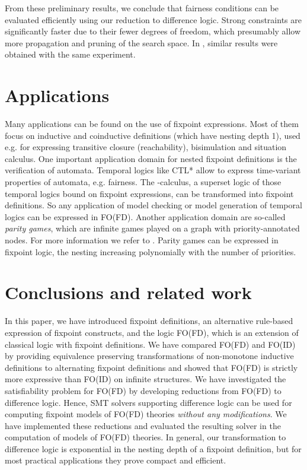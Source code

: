 \documentclass{tlp}
\begin{document}
From these preliminary results, we conclude that fairness conditions can be evaluated efficiently using our reduction to difference logic. Strong constraints are significantly faster due to their fewer degrees of freedom, which presumably allow more propagation and pruning of the search space. In \cite{wlp/KeinanenN04}, similar results were obtained with the same experiment.

\section{Applications}\label{sec:app}
Many applications can be found on the use of fixpoint expressions. Most of them focus on inductive and coinductive definitions (which have nesting depth 1), used e.g. for expressing transitive closure (reachability), bisimulation and situation calculus. One important application domain for nested fixpoint definitions is the verification of automata. Temporal logics like CTL* allow to express time-variant properties of automata, e.g. fairness. The -calculus, a superset logic of those temporal logics bound on fixpoint expressions, can be transformed into fixpoint definitions. So any application of model checking or model generation of temporal logics can be expressed in FO(FD). Another application domain are so-called \emph{parity games}, which are infinite games played on a graph with priority-annotated nodes. For more information we refer to \cite{atva/FriedmannL09}. Parity games can be expressed in fixpoint logic, the nesting increasing polynomially with the number of priorities.

\section{Conclusions and related work}\label{sec:con}
In this paper, we have introduced fixpoint definitions, an alternative rule-based expression of fixpoint constructs, and the logic FO(FD), which is an extension of classical logic with fixpoint definitions. We have compared FO(FD) and FO(ID) by providing equivalence preserving transformations of non-monotone inductive definitions to alternating fixpoint definitions and showed that FO(FD) is strictly more expressive than FO(ID) on infinite structures. We have investigated the satisfiability problem for FO(FD) by developing reductions from FO(FD) to difference logic. Hence, SMT solvers supporting difference logic can be used for computing fixpoint models of FO(FD) theories {\em without any modifications}. We have implemented these reductions and evaluated the resulting solver in the computation of models of FO(FD) theories. In general, our transformation to difference logic is exponential in the nesting depth of a fixpoint definition, but for most practical applications they prove compact and efficient.
\end{document}
